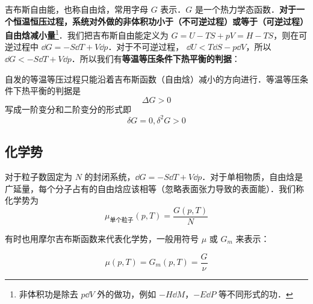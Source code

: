 

吉布斯自由能，也称自由焓，常用字母 $G$ 表示．$G$ 是一个热力学态函数．\textbf{对于一个恒温恒压过程，系统对外做的非体积功小于（不可逆过程）或等于（可逆过程）自由焓减小量}\footnote{非体积功是除去 $p\dd V$ 外的做功，例如 $-H\dd M$，$-E\dd P$ 等不同形式的功．}．我们把吉布斯自由能定义为 $G=U-TS+pV=H-TS$，则在可逆过程中 $\dd G= -S\dd T+V\dd p$．对于不可逆过程， $\dd U<T\dd S-p\dd V$，所以 $\dd G<-S\dd T+V\dd p$．所以我们有\textbf{等温等压条件下热平衡的判据}：

自发的等温等压过程只能沿着吉布斯函数（自由焓）减小的方向进行．等温等压条件下热平衡的判据是
\begin{equation}
\Delta G>0
\end{equation}
写成一阶变分和二阶变分的形式即
\begin{equation}\label{GibbsG_eq2}
\delta G=0,\delta^2 G>0
\end{equation}

\subsection{化学势}

对于粒子数固定为 $N$ 的封闭系统，$\dd G=-S\dd T+V\dd p$．对于单相物质，自由焓是广延量，每个分子占有的自由焓应该相等（忽略表面张力导致的表面能）．我们称化学势为
\begin{equation}
\mu_{\text{单个粒子}}(p,T)=\frac{G(p,T)}{N}
\end{equation}

有时也用摩尔吉布斯函数来代表化学势，一般用符号 $\mu$ 或 $G_m$ 来表示：

\begin{equation}\label{GibbsG_eq1}
\mu(p,T)=G_m(p,T)=\frac{G}{\nu}
\end{equation}

